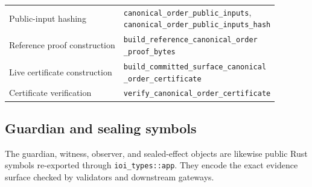 \documentclass[11pt]{article}
\newcommand{\code}[1]{\texttt{#1}}
\begin{document}
\begin{center}
\begin{tabularx}{\textwidth}{>{\raggedright\arraybackslash}p{} X}
Public-input hashing & \shortstack[l]{\code{canonical\_order\_public\_inputs},\\\code{canonical\_order\_public\_inputs\_hash}} \\
Reference proof construction & \shortstack[l]{\code{build\_reference\_canonical\_order}\\\code{\_proof\_bytes}} \\
Live certificate construction & \shortstack[l]{\code{build\_committed\_surface\_canonical}\\\code{\_order\_certificate}} \\
Certificate verification & \code{verify\_canonical\_order\_certificate} \\
\bottomrule
\end{tabularx}
\end{center}

\subsection{Guardian and sealing symbols}

The guardian, witness, observer, and sealed-effect objects are likewise public
Rust symbols re-exported through \code{ioi\_types::app}. They encode the exact
evidence surface checked by validators and downstream gateways.
\end{document}
